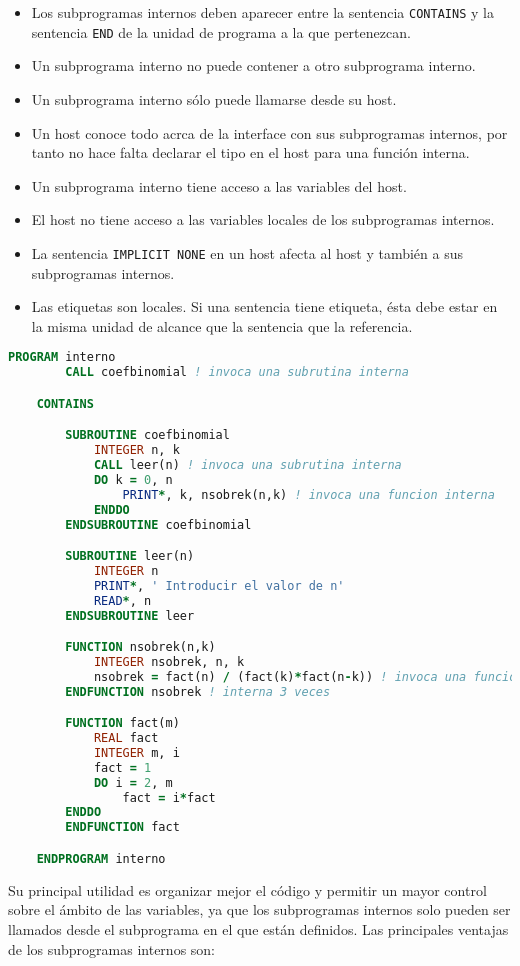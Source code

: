 \begin{itemize}
	\item Los subprogramas internos deben aparecer entre la sentencia {\tt CONTAINS} y la sentencia {\tt END} de la unidad de programa a la que pertenezcan. 
	\item Un subprograma interno no puede contener a otro subprograma interno.
	\item Un subprograma interno sólo puede llamarse desde su host.
	\item Un host conoce todo acrca de la interface con sus subprogramas internos, por tanto no hace falta declarar el tipo en el host para una función interna.
	\item Un subprograma interno tiene acceso a las variables del host.
	\item El host no tiene acceso a las variables locales de los subprogramas internos.
	\item La sentencia {\tt IMPLICIT NONE} en un host afecta al host y también a sus subprogramas internos. 
	\item Las etiquetas son locales. Si una sentencia tiene etiqueta, ésta debe estar en la misma unidad de alcance que la sentencia que la referencia.
\end{itemize}

\begin{lstlisting}[language=Fortran]
	PROGRAM interno
		CALL coefbinomial ! invoca una subrutina interna

	CONTAINS

		SUBROUTINE coefbinomial
			INTEGER n, k
			CALL leer(n) ! invoca una subrutina interna
			DO k = 0, n
				PRINT*, k, nsobrek(n,k) ! invoca una funcion interna
			ENDDO
		ENDSUBROUTINE coefbinomial

		SUBROUTINE leer(n)
			INTEGER n
			PRINT*, ' Introducir el valor de n'
			READ*, n
		ENDSUBROUTINE leer

		FUNCTION nsobrek(n,k)
			INTEGER nsobrek, n, k
			nsobrek = fact(n) / (fact(k)*fact(n-k)) ! invoca una funcion
		ENDFUNCTION nsobrek ! interna 3 veces

		FUNCTION fact(m)
			REAL fact
			INTEGER m, i
			fact = 1
			DO i = 2, m
				fact = i*fact
		ENDDO
		ENDFUNCTION fact

	ENDPROGRAM interno
\end{lstlisting}

Su principal utilidad es organizar mejor el código y permitir un mayor control sobre el ámbito de las variables, ya que los subprogramas internos solo pueden ser llamados desde el subprograma en el que están definidos. Las principales ventajas de los subprogramas internos son:

